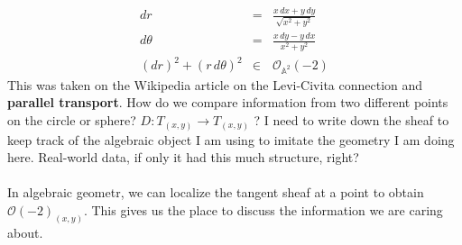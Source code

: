 \documentclass[12pt]{article}
\begin{document}
\begin{eqnarray}
dr &=& \frac{x \, dx + y \, dy}{\sqrt{x^2 + y^2}} \\
d\theta &=& \frac{x \, dy - y \, dx}{x^2 + y^2} \\ 
(dr)^2 + (r \, d\theta)^2 &\in & \mathcal{O}_{\mathbb{A}^2}(-2) 
\end{eqnarray}
This was taken on the Wikipedia article on the Levi-Civita connection and \textbf{parallel transport}. How do we compare information from two different points on the circle or sphere? $D: T_{(x,y)} \to T_{(x,y)}$ ? I need to write down the sheaf to keep track of the algebraic object I am using to imitate the geometry I am doing here.  Real-world data, if only it had this much structure, right? \\ \\
In  algebraic geometr, we can localize the tangent sheaf at a point to obtain $\mathcal{O}(-2)_{(x,y)}$.  This gives us the place to discuss the information  we are caring about.

\newpage
\end{document}
